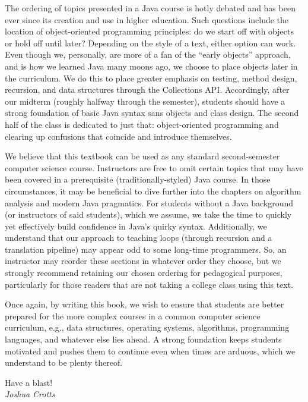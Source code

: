 The ordering of topics presented in a Java course is hotly debated and has been ever since its creation and use in higher education. Such questions include the location of object-oriented programming principles: do we start off with objects or hold off until later? Depending on the style of a text, either option can work. Even though we, personally, are more of a fan of the ``early objects'' approach, and is how we learned Java many moons ago, we choose to place objects later in the curriculum. We do this to place greater emphasis on testing, method design, recursion, and data structures through the Collections API. Accordingly, after our midterm (roughly halfway through the semester), students should have a strong foundation of basic Java syntax sans objects and class design. The second half of the class is dedicated to just that: object-oriented programming and clearing up confusions that coincide and introduce themselves. 

We believe that this textbook can be used as any standard second-semester computer science course. Instructors are free to omit certain topics that may have been covered in a prerequisite (traditionally-styled) Java course. In those circumstances, it may be beneficial to dive further into the chapters on algorithm analysis and modern Java pragmatics. For students without a Java background (or instructors of said students), which we assume, we take the time to quickly yet effectively build confidence in Java's quirky syntax. Additionally, we understand that our approach to teaching loops (through recursion and a translation pipeline) may appear odd to some long-time programmers. So, an instructor may reorder these sections in whatever order they choose, but we strongly recommend retaining our chosen ordering for pedagogical purposes, particularly for those readers that are not taking a college class using this text.

Once again, by writing this book, we wish to ensure that students are better prepared for the more complex courses in a common computer science curriculum, e.g., data structures, operating systems, algorithms, programming languages, and whatever else lies ahead. A strong foundation keeps students motivated and pushes them to continue even when times are arduous, which we understand to be plenty thereof.

\begin{flushright}
Have a blast!\\\textit{Joshua Crotts}
\end{flushright}